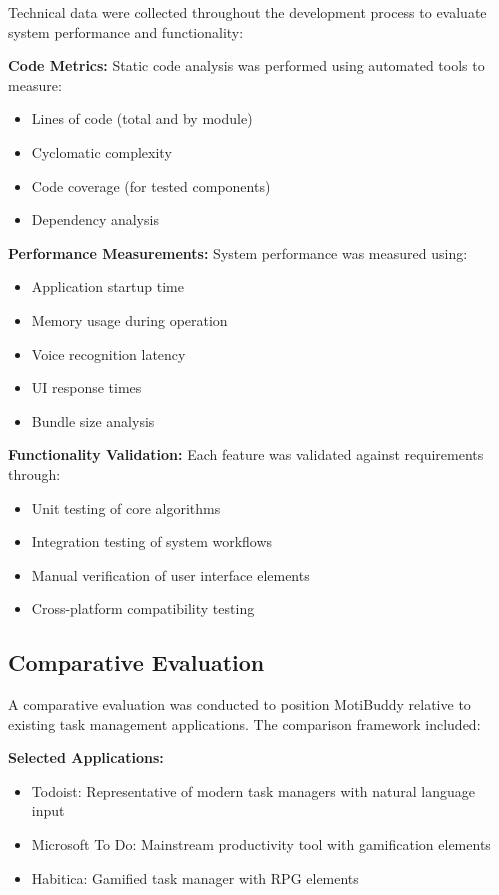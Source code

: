 \completed

Technical data were collected throughout the development process to evaluate system performance and functionality:

\textbf{Code Metrics:} Static code analysis was performed using automated tools to measure:
\begin{itemize}
    \item Lines of code (total and by module)
    \item Cyclomatic complexity
    \item Code coverage (for tested components)
    \item Dependency analysis
\end{itemize}

\textbf{Performance Measurements:} System performance was measured using:
\begin{itemize}
    \item Application startup time
    \item Memory usage during operation
    \item Voice recognition latency
    \item UI response times
    \item Bundle size analysis
\end{itemize}

\textbf{Functionality Validation:} Each feature was validated against requirements through:
\begin{itemize}
    \item Unit testing of core algorithms
    \item Integration testing of system workflows
    \item Manual verification of user interface elements
    \item Cross-platform compatibility testing
\end{itemize}

\subsection{Comparative Evaluation}

\completed

A comparative evaluation was conducted to position MotiBuddy relative to existing task management applications. The comparison framework included:

\textbf{Selected Applications:}
\begin{itemize}
    \item Todoist: Representative of modern task managers with natural language input
    \item Microsoft To Do: Mainstream productivity tool with gamification elements
    \item Habitica: Gamified task manager with RPG elements
\end{itemize}

